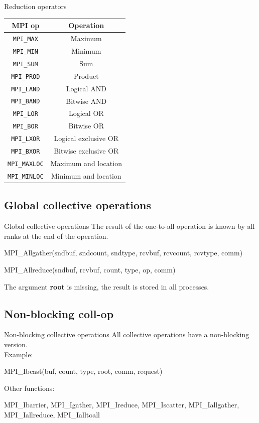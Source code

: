 \documentclass[aspectratio=43]{beamer}
\begin{document}
\begin{frame}[fragile]{Reduction operators}
\begin{center}
\begin{tabular}{|c||c|}
    \hline
    \color{cscsblue}\textbf{MPI op} & \color{cscsbrown}\textbf{Operation} \\\hline\hline
    \verb+MPI_MAX+ & Maximum\\\hline
    \verb+MPI_MIN+ & Minimum\\\hline
    \verb+MPI_SUM+ & Sum\\\hline
    \verb+MPI_PROD+ & Product\\\hline
    \verb+MPI_LAND+ & Logical AND\\\hline
    \verb+MPI_BAND+ & Bitwise AND\\\hline
    \verb+MPI_LOR+ & Logical OR\\\hline
    \verb+MPI_BOR+ & Bitwise OR\\\hline
    \verb+MPI_LXOR+ & Logical exclusive OR\\\hline
    \verb+MPI_BXOR+ & Bitwise exclusive OR\\\hline
    \verb+MPI_MAXLOC+ & Maximum and location\\\hline
    \verb+MPI_MINLOC+ & Minimum and location\\\hline
\end{tabular}
\end{center}
\end{frame}

\subsection{Global collective operations}
\begin{frame}[fragile]{Global collective operations}
The result of the one-to-all operation is known by all ranks at the end of the operation.
\begin{Pseudolisting}[]{}
MPI_Allgather(sndbuf, sndcount, sndtype,
              rcvbuf, rcvcount, rcvtype, comm)

MPI_Allreduce(sndbuf, rcvbuf, count, type, op, comm)
\end{Pseudolisting}
The argument \textbf{root} is missing, the result is stored in all processes.\\
\end{frame}

\subsection{Non-blocking coll-op}
\begin{frame}[fragile]{Non-blocking collective operations}
All collective operations have a non-blocking version.\\
Example:
\begin{Pseudolisting}[]{}
MPI_Ibcast(buf, count, type, root, comm, request)
\end{Pseudolisting}
Other functions:\\
\begin{Pseudolisting}[]{}
MPI_Ibarrier, MPI_Igather, MPI_Ireduce, MPI_Iscatter,
MPI_Iallgather, MPI_Iallreduce, MPI_Ialltoall
\end{Pseudolisting}
\end{frame}
\end{document}
